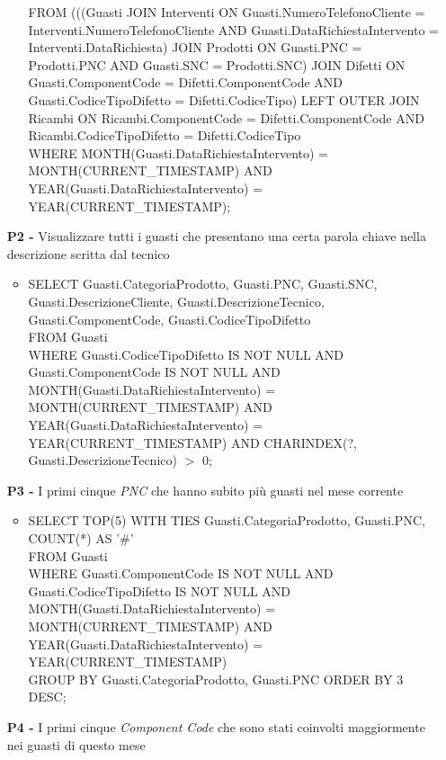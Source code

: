 \documentclass[a4paper, 12pt]{report}
\begin{document}
\begin{itemize}
\begin{itemize}[leftmargin=*, topsep=0pt]
			FROM (((Guasti JOIN Interventi ON Guasti.NumeroTelefonoCliente = Interventi.NumeroTelefonoCliente AND Guasti.DataRichiestaIntervento = Interventi.DataRichiesta) JOIN Prodotti ON Guasti.PNC = Prodotti.PNC AND Guasti.SNC = Prodotti.SNC) JOIN Difetti ON Guasti.ComponentCode = Difetti.ComponentCode AND Guasti.CodiceTipoDifetto = Difetti.CodiceTipo) LEFT OUTER JOIN Ricambi ON Ricambi.ComponentCode = Difetti.ComponentCode AND Ricambi.CodiceTipoDifetto = Difetti.CodiceTipo\\
			WHERE MONTH(Guasti.DataRichiestaIntervento) = MONTH(CURRENT\_TIMESTAMP) AND YEAR(Guasti.DataRichiestaIntervento) = YEAR(CURRENT\_TIMESTAMP);
		\end{itemize}
	\item[\textbf{P2 -}] Visualizzare tutti i guasti che presentano una certa parola chiave nella descrizione scritta dal tecnico
		\begin{itemize}[leftmargin=*, topsep=0pt]
			\item SELECT Guasti.CategoriaProdotto, Guasti.PNC, Guasti.SNC, Guasti.DescrizioneCliente, Guasti.DescrizioneTecnico, Guasti.ComponentCode, Guasti.CodiceTipoDifetto\\
			FROM Guasti\\
			WHERE Guasti.CodiceTipoDifetto IS NOT NULL AND Guasti.ComponentCode IS NOT NULL AND MONTH(Guasti.DataRichiestaIntervento) = \\MONTH(CURRENT\_TIMESTAMP) AND YEAR(Guasti.DataRichiestaIntervento) = YEAR(CURRENT\_TIMESTAMP) AND CHARINDEX(?, Guasti.DescrizioneTecnico) $>$ 0;
		\end{itemize}
	\item[\textbf{P3 -}] I primi cinque \textit{PNC} che hanno subito più guasti nel mese corrente
		\begin{itemize}[leftmargin=*, topsep=0pt]
			\item SELECT TOP(5) WITH TIES Guasti.CategoriaProdotto, Guasti.PNC, COUNT(*) AS '\#'\\
			FROM Guasti\\
			WHERE Guasti.ComponentCode IS NOT NULL AND Guasti.CodiceTipoDifetto IS NOT NULL AND MONTH(Guasti.DataRichiestaIntervento) = \\MONTH(CURRENT\_TIMESTAMP) AND YEAR(Guasti.DataRichiestaIntervento) = YEAR(CURRENT\_TIMESTAMP)\\
			GROUP BY Guasti.CategoriaProdotto, Guasti.PNC ORDER BY 3 DESC;
		\end{itemize}
	\item[\textbf{P4 -}] I primi cinque \textit{Component Code} che sono stati coinvolti maggiormente nei guasti di questo mese

\end{itemize}
\end{document}
